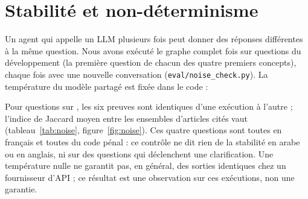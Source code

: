 \section{Stabilité et non-déterminisme}\label{sec:stabilite}

Un agent qui appelle un LLM plusieurs fois peut donner des réponses différentes à la même question. Nous avons exécuté le
graphe complet \NNoiseRuns{} fois sur \NNoiseQuestions{} questions du développement (la première question de chacun des
quatre premiers concepts), chaque fois avec une nouvelle conversation (\texttt{eval/noise\_check.py}). La température du
modèle partagé est fixée dans le code :



Pour \NNoiseSameev{} questions sur \NNoiseQuestions, les six preuves sont identiques d'une exécution à l'autre ; l'indice de
Jaccard moyen entre les ensembles d'articles cités vaut \NNoiseJaccard{} (tableau~\ref{tab:noise}, figure~\ref{fig:noise}).
Ces quatre questions sont toutes en français et toutes du code pénal : ce contrôle ne dit rien de la stabilité en arabe ou en
anglais, ni sur des questions qui déclenchent une clarification. Une température nulle ne garantit pas, en général, des
sorties identiques chez un fournisseur d'API ; ce résultat est une observation sur ces exécutions, non une garantie.


